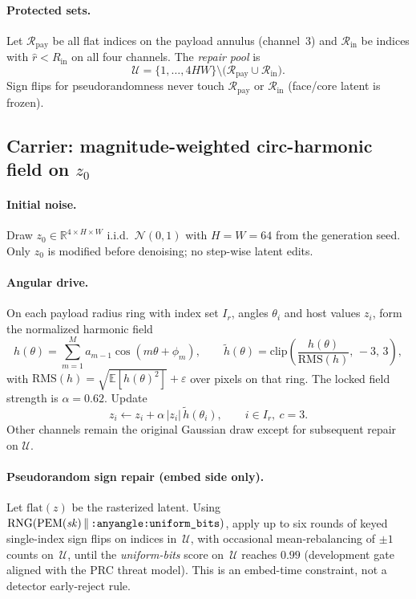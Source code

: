 \paragraph{Protected sets.}
Let \(\mathcal{R}_{\mathrm{pay}}\) be all flat indices on the payload annulus
(channel~3) and \(\mathcal{R}_{\mathrm{in}}\) be indices with \(\hat r<R_{\mathrm{in}}\)
on all four channels.
The \emph{repair pool} is
\[
\mathcal{U}=\{1,\ldots,4HW\}\setminus
\bigl(\mathcal{R}_{\mathrm{pay}}\cup\mathcal{R}_{\mathrm{in}}\bigr).
\]
Sign flips for pseudorandomness never touch \(\mathcal{R}_{\mathrm{pay}}\) or
\(\mathcal{R}_{\mathrm{in}}\) (face/core latent is frozen).

\subsection{Carrier: magnitude-weighted circ-harmonic field on \(z_0\)}
\label{sec:anyangle-carrier}

\paragraph{Initial noise.}
Draw \(z_0\in\mathbb{R}^{4\times H\times W}\) i.i.d.\ \(\mathcal{N}(0,1)\) with
\(H=W=64\) from the generation seed.
Only \(z_0\) is modified before denoising; no step-wise latent edits.

\paragraph{Angular drive.}
On each payload radius ring with index set \(I_r\), angles \(\theta_i\) and host
values \(z_i\), form the normalized harmonic field
\[
h(\theta)=\sum_{m=1}^{M} a_{m-1}\cos(m\theta+\phi_m),\qquad
\widetilde h(\theta)=\mathrm{clip}\!\left(\frac{h(\theta)}{\mathrm{RMS}(h)},\,-3,\,3\right),
\]
with \(\mathrm{RMS}(h)=\sqrt{\mathbb{E}[h(\theta)^2]}+\varepsilon\) over pixels on
that ring.
The locked field strength is \(\alpha=0.62\).
Update
\[
z_i \leftarrow z_i + \alpha\,|z_i|\,\widetilde h(\theta_i),
\qquad i\in I_r,\ c=3.
\]
Other channels remain the original Gaussian draw except for subsequent repair on
\(\mathcal{U}\).

\paragraph{Pseudorandom sign repair (embed side only).}
Let \(\mathrm{flat}(z)\) be the rasterized latent.
Using \(\mathrm{RNG}(\mathrm{PEM}(\mathit{sk})\,\|\,\text{\texttt{:anyangle:uniform\_bits}})\),
apply up to six rounds of keyed single-index sign flips on indices in~\(\mathcal{U}\),
with occasional mean-rebalancing of \(\pm1\) counts on~\(\mathcal{U}\), until the
\emph{uniform-bits} score on~\(\mathcal{U}\) reaches \(0.99\)
(development gate aligned with the PRC threat model).
This is an embed-time constraint, not a detector early-reject rule.

